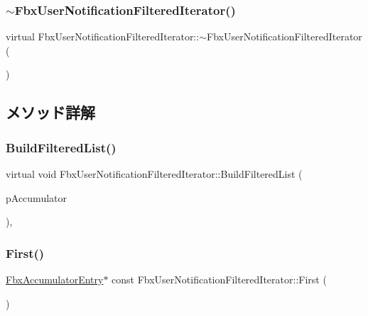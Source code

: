 \subsubsection{\texorpdfstring{$\sim$\+Fbx\+User\+Notification\+Filtered\+Iterator()}{~FbxUserNotificationFilteredIterator()}}
{\footnotesize\ttfamily virtual Fbx\+User\+Notification\+Filtered\+Iterator\+::$\sim$\+Fbx\+User\+Notification\+Filtered\+Iterator (\begin{DoxyParamCaption}{ }\end{DoxyParamCaption})\hspace{0.3cm}{\ttfamily [virtual]}}



\subsection{メソッド詳解}
\mbox{\label{class_fbx_user_notification_filtered_iterator_ab4aeac096dc929ed94aebe72506524ef}} 
\subsubsection{\texorpdfstring{Build\+Filtered\+List()}{BuildFilteredList()}}
{\footnotesize\ttfamily virtual void Fbx\+User\+Notification\+Filtered\+Iterator\+::\+Build\+Filtered\+List (\begin{DoxyParamCaption}\item[{\hyperlink{class_fbx_user_notification}{Fbx\+User\+Notification} \&}]{p\+Accumulator }\end{DoxyParamCaption})\hspace{0.3cm}{\ttfamily [protected]}, {\ttfamily [virtual]}}

\mbox{\label{class_fbx_user_notification_filtered_iterator_a61fc433ba00db459bac761a49e1121a2}} 
\subsubsection{\texorpdfstring{First()}{First()}}
{\footnotesize\ttfamily \hyperlink{class_fbx_accumulator_entry}{Fbx\+Accumulator\+Entry}$\ast$ const Fbx\+User\+Notification\+Filtered\+Iterator\+::\+First (\begin{DoxyParamCaption}{ }\end{DoxyParamCaption})}

